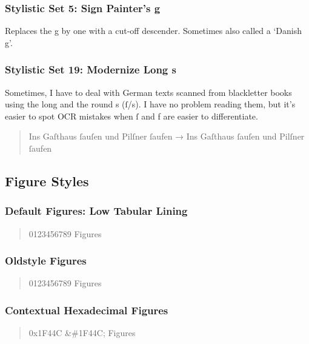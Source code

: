 \subsubsection{Stylistic Set 5: Sign Painter’s g}
Replaces the g by one with a cut-off descender. Sometimes also called a ‘Danish g’.
\begin{quote}
{ \sample}
\end{quote}

\subsubsection{Stylistic Set 19: Modernize Long s}

Sometimes, I have to deal with German texts scanned from blackletter books using the long and the round s (ſ/s). I have no problem reading them, but it’s easier to spot OCR mistakes when ſ and f are easier to differentiate.

\begin{quote}
Ins Gaſthaus ſauſen und Pilſner ſaufen → { Ins Gaſthaus ſauſen und Pilſner ſaufen}
\end{quote}

\subsection{Figure Styles}

\subsubsection{Default Figures: Low Tabular Lining}

\begin{quote}
0123456789 Figures
\end{quote}

\subsubsection{Oldstyle Figures}
\begin{quote}
{ 0123456789 Figures}
\end{quote}

\subsubsection{Contextual Hexadecimal Figures}
\begin{quote}
{ 0x1F44C \&\#1F44C; Figures}
\end{quote}

